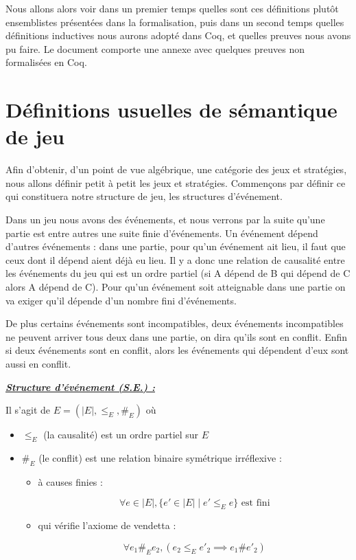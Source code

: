 \documentclass[a4paper,12pt]{article}
\renewenvironment{leftbar}{
  \def\FrameCommand{\vrule width 1pt \hspace{10pt}}
  \MakeFramed {\advance\hsize-\width \FrameRestore}
\setlength{\parskip}{10pt}}
 {\endMakeFramed}
\newenvironment{answer}[1]
{
  \vspace{0.5cm} \noindent \begin{minipage}{\linewidth}
    \textbf{\textit{\uline{#1}}}
    \begin{leftbar}
}
{
    \end{leftbar}\end{minipage}\vspace{0.2cm}
}
\begin{document}
Nous allons alors voir dans un premier temps quelles sont ces définitions
plutôt ensemblistes présentées dans la formalisation, puis dans un second temps
quelles définitions inductives nous aurons adopté dans Coq, et quelles preuves
nous avons pu faire.
Le document comporte une annexe avec quelques preuves non formalisées en Coq.

\newpage
\section{Définitions usuelles de sémantique de jeu}

Afin d'obtenir, d'un point de vue algébrique, une catégorie des jeux et
stratégies, nous allons définir petit à petit les jeux et stratégies.
Commençons par définir ce qui constituera notre structure de jeu,
les structures d'événement.

Dans un jeu nous avons des événements, et nous verrons par la suite qu'une
partie est entre autres une suite finie d'événements.
Un événement dépend d'autres événements : dans une partie, pour qu'un événement
ait lieu, il faut que ceux dont il dépend aient déjà eu lieu.
Il y a donc une relation de causalité entre les événements du jeu qui est
un ordre partiel (si A dépend de B qui dépend de C alors A dépend de C).
Pour qu'un événement soit atteignable dans une partie on va exiger qu'il
dépende d'un nombre fini d'événements.

De plus certains événements sont incompatibles, deux événements incompatibles
ne peuvent arriver tous deux dans une partie, on dira qu'ils sont en conflit.
Enfin si deux événements sont en conflit,
alors les événements qui dépendent d'eux sont aussi en conflit.



\begin{answer}{Structure d'événement (S.E.) :}

Il s'agit de $E = (|E|, \leq_E, \#_E)$ où
\begin{itemize}
\item $\leq_E$ (la causalité) est un ordre partiel sur $E$
\item $\#_E$ (le conflit) est une relation binaire symétrique irréflexive :
\begin{itemize}
\item à causes finies :

\begin{equation*}\forall e \in |E|, \{e' \in |E| \mid e' \leq_E e\}\text{ est fini}\end{equation*}

\item qui vérifie l'axiome de vendetta :

\begin{equation*}\forall e_1 \#_E e_2, (e_2 \leq_E e'_2 \implies e_1 \# e'_2)\end{equation*}
\end{itemize}
\end{itemize}
\end{answer}
\end{document}
